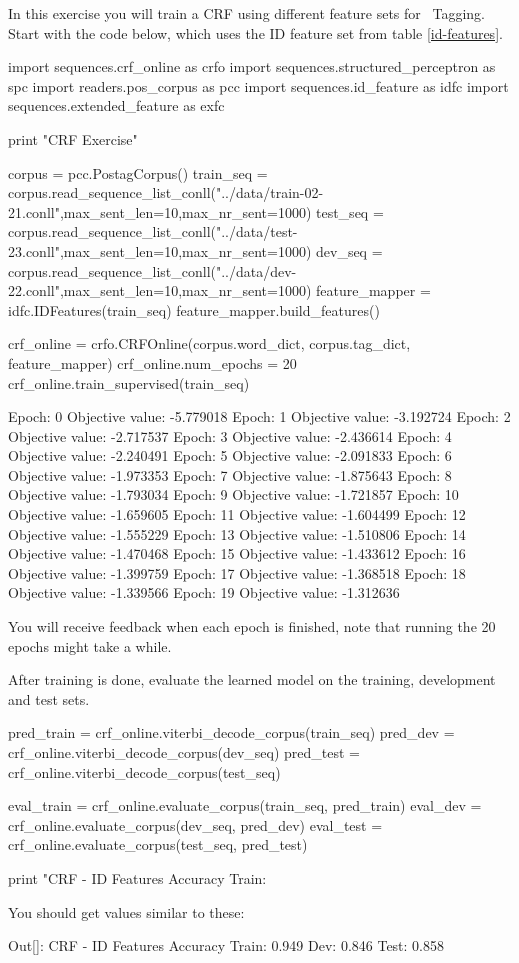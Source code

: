 \begin{exercise}\label{exer:crf1}
In this exercise you will train a CRF
using different feature sets for \pos\ Tagging. Start with the code below, which uses the ID feature set from table \ref{id-features}.
\begin{python}
import sequences.crf_online as crfo
import sequences.structured_perceptron as spc
import readers.pos_corpus as pcc
import sequences.id_feature as idfc
import sequences.extended_feature as exfc

print "CRF Exercise"

corpus = pcc.PostagCorpus()
train_seq = corpus.read_sequence_list_conll("../data/train-02-21.conll",max_sent_len=10,max_nr_sent=1000)
test_seq = corpus.read_sequence_list_conll("../data/test-23.conll",max_sent_len=10,max_nr_sent=1000)
dev_seq = corpus.read_sequence_list_conll("../data/dev-22.conll",max_sent_len=10,max_nr_sent=1000)
feature_mapper = idfc.IDFeatures(train_seq)
feature_mapper.build_features()

crf_online = crfo.CRFOnline(corpus.word_dict, corpus.tag_dict, feature_mapper)
crf_online.num_epochs = 20
crf_online.train_supervised(train_seq)

Epoch: 0 Objective value: -5.779018
Epoch: 1 Objective value: -3.192724
Epoch: 2 Objective value: -2.717537
Epoch: 3 Objective value: -2.436614
Epoch: 4 Objective value: -2.240491
Epoch: 5 Objective value: -2.091833
Epoch: 6 Objective value: -1.973353
Epoch: 7 Objective value: -1.875643
Epoch: 8 Objective value: -1.793034
Epoch: 9 Objective value: -1.721857
Epoch: 10 Objective value: -1.659605
Epoch: 11 Objective value: -1.604499
Epoch: 12 Objective value: -1.555229
Epoch: 13 Objective value: -1.510806
Epoch: 14 Objective value: -1.470468
Epoch: 15 Objective value: -1.433612
Epoch: 16 Objective value: -1.399759
Epoch: 17 Objective value: -1.368518
Epoch: 18 Objective value: -1.339566
Epoch: 19 Objective value: -1.312636
\end{python}

You will receive feedback when each epoch is finished, note that
running the 20 epochs might take a while.

After training is done, evaluate the learned model on the training, development and test sets.

\begin{python}
pred_train = crf_online.viterbi_decode_corpus(train_seq)
pred_dev = crf_online.viterbi_decode_corpus(dev_seq)
pred_test = crf_online.viterbi_decode_corpus(test_seq)

eval_train = crf_online.evaluate_corpus(train_seq, pred_train)
eval_dev = crf_online.evaluate_corpus(dev_seq, pred_dev)
eval_test = crf_online.evaluate_corpus(test_seq, pred_test)

print "CRF - ID Features Accuracy Train: %
\end{python}

You should get values similar to these:
\begin{python}
Out[]: CRF - 
ID Features Accuracy Train: 0.949 Dev: 0.846 Test: 0.858
\end{python}
\end{exercise}

